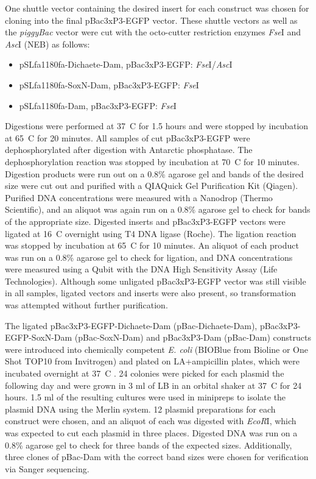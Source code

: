 One shuttle vector containing the desired insert for each construct was chosen for cloning into the final pBac{3xP3-EGFP} vector. These shuttle vectors as well as the \emph{piggyBac} vector were cut with the octo-cutter restriction enzymes \emph{Fse}I and \emph{Asc}I (NEB) as follows:  
\begin{itemize}
	\item pSLfa1180fa-Dichaete-Dam, pBac{3xP3-EGFP}: \emph{Fse}I/\emph{Asc}I
	\item pSLfa1180fa-SoxN-Dam, pBac{3xP3-EGFP}: \emph{Fse}I
	\item pSLfa1180fa-Dam, pBac{3xP3-EGFP}: \emph{Fse}I
\end{itemize}
Digestions were performed at 37\degree~C for 1.5 hours and were stopped by incubation at 65\degree~C for 20 minutes. All samples of cut pBac{3xP3-EGFP} were dephosphorylated after digestion with Antarctic phosphatase. The dephosphorylation reaction was stopped by incubation at 70\degree~C for 10 minutes. Digestion products were run out on a 0.8\% agarose gel and bands of the desired size were cut out and purified with a QIAQuick Gel Purification Kit (Qiagen). Purified DNA concentrations were measured with a Nanodrop (Thermo Scientific), and an aliquot was again run on a 0.8\% agarose gel to check for bands of the appropriate size. Digested inserts and pBac{3xP3-EGFP} vectors were ligated at 16\degree~C overnight using T4 DNA ligase (Roche). The ligation reaction was stopped by incubation at 65\degree~C for 10 minutes. An aliquot of each product was run on a 0.8\% agarose gel to check for ligation, and DNA concentrations were measured using a Qubit with the DNA High Sensitivity Assay (Life Technologies). Although some unligated pBac{3xP3-EGFP} vector was still visible in all samples, ligated vectors and inserts were also present, so transformation was attempted without further purification.

The ligated pBac{3xP3-EGFP}-Dichaete-Dam (pBac-Dichaete-Dam), pBac{3xP3-EGFP}-SoxN-Dam (pBac-SoxN-Dam) and pBac{3xP3}-Dam (pBac-Dam) constructs were introduced into chemically competent \emph{E. coli} (BIOBlue from Bioline or One Shot TOP10 from Invitrogen) and plated on LA+ampicillin plates, which were incubated overnight at 37\degree~C . 24 colonies were picked for each plasmid the following day and were grown in 3 ml of LB in an orbital shaker at 37\degree~C for 24 hours. 1.5 ml of the resulting cultures were used in minipreps to isolate the plasmid DNA using the Merlin system. 12 plasmid preparations for each construct were chosen, and an aliquot of each was digested with \emph{EcoR}I, which was expected to cut each plasmid in three places. Digested DNA was run on a 0.8\% agarose gel to check for three bands of the expected sizes. Additionally, three clones of pBac-Dam with the correct band sizes were chosen for verification via Sanger sequencing.

